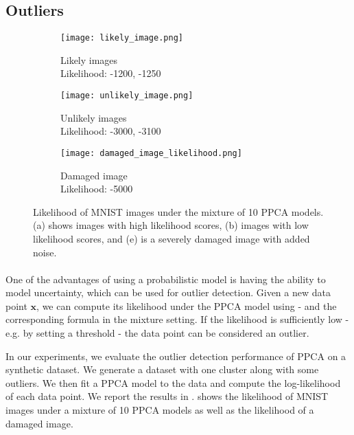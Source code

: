 \documentclass{article}
\begin{document}
\subsection{Outliers}

\begin{figure}[H]
    \centering
    \begin{subfigure}[b]{0.1\textwidth}
        \centering
        \texttt{[image: likely\_image.png]}
        \caption{Likely images \\ Likelihood: -1200, -1250}
        \label{fig:likely_image_1}
    \end{subfigure}
    \hfill
    \begin{subfigure}[b]{0.1\textwidth}
        \centering
        \texttt{[image: unlikely\_image.png]}
        \caption{Unlikely images \\ Likelihood: -3000, -3100}
        \label{fig:unlikely_image_1}
    \end{subfigure}
    \hfill
    \begin{subfigure}[b]{0.1\textwidth}
        \centering
        \texttt{[image: damaged\_image\_likelihood.png]}
        \caption{Damaged image \\ Likelihood: -5000}
        \label{fig:damaged_image_likelihood}
    \end{subfigure}
    \caption{Likelihood of MNIST images under the mixture of 10 PPCA models. (a) shows images with high likelihood scores, (b) images with low likelihood scores, and (e) is a severely damaged image with added noise.}
    \label{fig:mnist_likelihood}
\end{figure}

\paragraph{} One of the advantages of using a probabilistic model is having the ability to model uncertainty, which can be used for outlier detection. Given a new data point $\mathbf{x}$, we can compute its likelihood under the PPCA model using  - and the corresponding formula in the mixture setting. If the likelihood is sufficiently low - e.g. by setting a threshold - the data point can be considered an outlier.

In our experiments, we evaluate the outlier detection performance of PPCA on a synthetic dataset. We generate a dataset with one cluster along with some outliers. We then fit a PPCA model to the data and compute the log-likelihood of each data point. We report the results in .  shows the likelihood of MNIST images under a mixture of 10 PPCA models as well as the likelihood of a damaged image.
\end{document}
